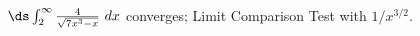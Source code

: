 {$\ds \int_{2}^\infty \frac{4}{\sqrt{7x^3-x}} \ dx$}
{converges; Limit Comparison Test with $1/x^{3/2}$.}
